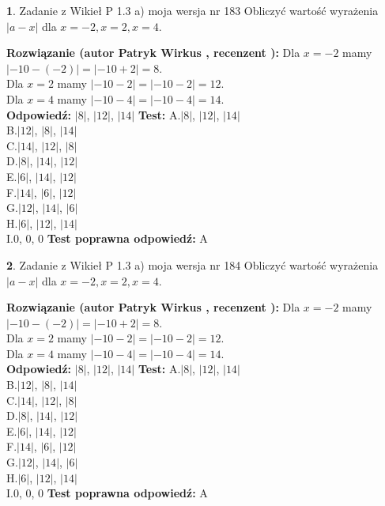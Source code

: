 \documentclass[12pt, a4paper]{article}
\theoremstyle{definition} %
\newtheorem{zad}{}
\newcommand{\zadStart}[1]{\begin{zad}#1\newline}
\newcommand{\zadStop}{\end{zad}}
\newcommand{\rozwStart}[2]{\noindent \textbf{Rozwiązanie (autor #1 , recenzent #2): }\newline}
\newcommand{\rozwStop}{\newline}
\newcommand{\odpStart}{\noindent \textbf{Odpowiedź:}\newline}
\newcommand{\odpStop}{\newline}
\newcommand{\testStart}{\noindent \textbf{Test:}\newline}
\newcommand{\testStop}{\newline}
\newcommand{\kluczStart}{\noindent \textbf{Test poprawna odpowiedź:}\newline}
\newcommand{\kluczStop}{\newline}
\begin{document}
\zadStart{Zadanie z Wikieł P 1.3 a) moja wersja nr 183}
Obliczyć wartość wyrażenia $|a - x|$ dla $x=-2,x=2,x=4$.
\zadStop
\rozwStart{Patryk Wirkus}{}
Dla $x = -2$ mamy $|-10 - (-2)| = |-10 + 2| = 8$.\\
Dla $x = 2$ mamy $|-10 - 2| = |-10 - 2| = 12$.\\
Dla $x = 4$ mamy $|-10 - 4| = |-10 - 4| = 14$.\\
\rozwStop
\odpStart
$|8|$, $|12|$, $|14|$
\odpStop
\testStart
A.$|8|$, $|12|$, $|14|$\\
B.$|12|$, $|8|$, $|14|$\\
C.$|14|$, $|12|$, $|8|$\\
D.$|8|$, $|14|$, $|12|$\\
E.$|6|$, $|14|$, $|12|$\\
F.$|14|$, $|6|$, $|12|$\\
G.$|12|$, $|14|$, $|6|$\\
H.$|6|$, $|12|$, $|14|$\\
I.$0$, $0$, $0$
\testStop
\kluczStart
A
\kluczStop



\zadStart{Zadanie z Wikieł P 1.3 a) moja wersja nr 184}
Obliczyć wartość wyrażenia $|a - x|$ dla $x=-2,x=2,x=4$.
\zadStop
\rozwStart{Patryk Wirkus}{}
Dla $x = -2$ mamy $|-10 - (-2)| = |-10 + 2| = 8$.\\
Dla $x = 2$ mamy $|-10 - 2| = |-10 - 2| = 12$.\\
Dla $x = 4$ mamy $|-10 - 4| = |-10 - 4| = 14$.\\
\rozwStop
\odpStart
$|8|$, $|12|$, $|14|$
\odpStop
\testStart
A.$|8|$, $|12|$, $|14|$\\
B.$|12|$, $|8|$, $|14|$\\
C.$|14|$, $|12|$, $|8|$\\
D.$|8|$, $|14|$, $|12|$\\
E.$|6|$, $|14|$, $|12|$\\
F.$|14|$, $|6|$, $|12|$\\
G.$|12|$, $|14|$, $|6|$\\
H.$|6|$, $|12|$, $|14|$\\
I.$0$, $0$, $0$
\testStop
\kluczStart
A
\kluczStop
\end{document}

